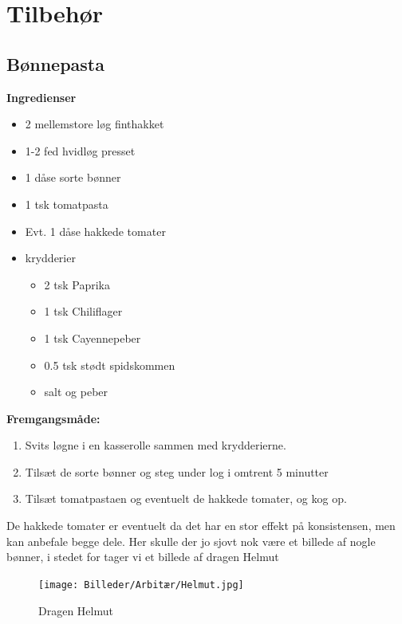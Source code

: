 \documentclass{book}
\begin{document}
\chapter{Tilbehør}
\minitoc
\newpage \section{Bønnepasta}
\begin{minipage}[t]{0.5\textwidth}
\textbf{Ingredienser}
\begin{itemize}
    \item 2 mellemstore løg finthakket
    \item 1-2 fed hvidløg presset
    \item 1 dåse sorte bønner
    \item 1 tsk tomatpasta
    \item Evt. 1 dåse hakkede tomater
    \item krydderier
    \begin{itemize}
        \item 2 tsk Paprika
        \item 1 tsk Chiliflager
        \item 1 tsk Cayennepeber
        \item 0.5 tsk stødt spidskommen
        \item salt og peber
    \end{itemize}
\end{itemize}
\end{minipage}
\begin{minipage}[t]{0.5\textwidth}
\textbf{Fremgangsmåde:}
\begin{enumerate}
    \item Svits løgne i en kasserolle sammen med krydderierne.
    \item Tilsæt de sorte bønner og steg under log i omtrent 5 minutter
    \item Tilsæt tomatpastaen og eventuelt de hakkede tomater, og kog op.
\end{enumerate}
\end{minipage}
De hakkede tomater er eventuelt da det har en stor effekt på konsistensen, men kan anbefale begge dele.
\newpage 
Her skulle der jo sjovt nok være et billede af nogle bønner, i stedet for tager vi et billede af dragen Helmut 
\begin{figure}
    \centering
    \texttt{[image: Billeder/Arbitær/Helmut.jpg]}
    \caption{Dragen Helmut}
  
\end{figure}
\end{document}
